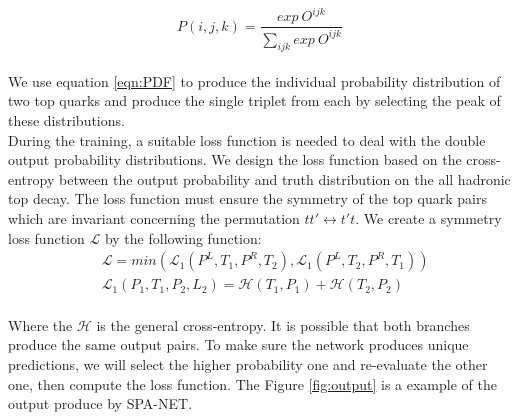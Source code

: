 \\
\begin{equation}\label{eqn:PDF}
	P(i,j,k) = \frac{exp\ O^{ijk}}{\sum_{ijk} exp\ O^{ijk}}
\end{equation}
\\
We use equation \ref{eqn:PDF} to produce the individual probability distribution of two top quarks and produce the single triplet from each by selecting the peak of these distributions. 
\\
During the training, a suitable loss function is needed to deal with the double output probability distributions. We design the loss function based on the cross-entropy between the output probability and truth distribution on the all hadronic top decay. The loss function must ensure the symmetry of the top quark pairs which are invariant concerning the permutation $tt' \leftrightarrow t't$.  We create a symmetry loss function $\mathcal{L}$ by the following function:
\\
\begin{align}
		&\mathcal{L} = min(\mathcal{L}_{1}(P^{L}, T_{1}, P^{R}, T_{2}), \mathcal{L}_{1}(P^{L}, T_{2}, P^{R}, T_{1})) \\
		&\mathcal{L}_{1}(P_{1}, T_{1}, P_{2}, L_{2}) = \mathcal{H}(T_{1}, P_{1}) +\mathcal{H}(T_{2}, P_{2})
\end{align}
\\
Where the $\mathcal{H}$ is the general cross-entropy. It is possible that both branches produce the same output pairs. To make sure the network produces unique predictions, we will select the higher probability one and re-evaluate the other one, then compute the loss function. The Figure \ref{fig:output} is a example of the output produce by SPA-NET.










